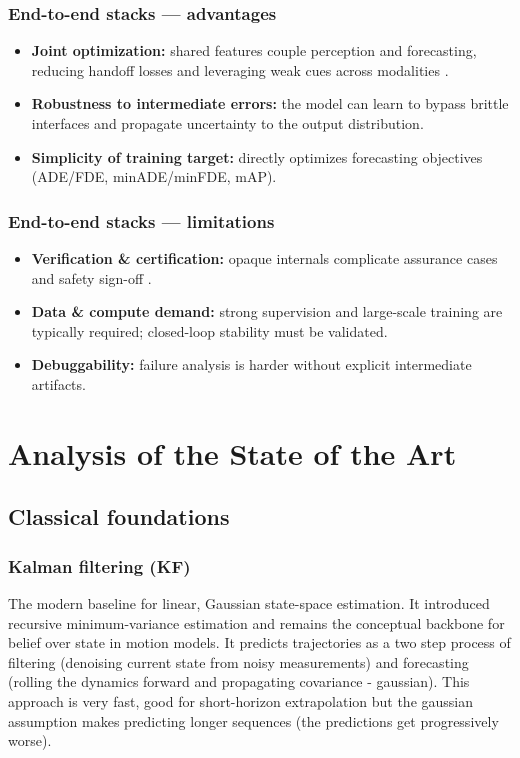 \documentclass[12pt,a4paper]{report}
\begin{document}
\subsubsection{End-to-end stacks — advantages}
\begin{itemize}
  \item \textbf{Joint optimization:} shared features couple perception and forecasting, reducing handoff losses and leveraging weak cues across modalities \cite{BEVerse2022}.
  \item \textbf{Robustness to intermediate errors:} the model can learn to bypass brittle interfaces and propagate uncertainty to the output distribution.
  \item \textbf{Simplicity of training target:} directly optimizes forecasting objectives (ADE/FDE, minADE/minFDE, mAP).
\end{itemize}

\subsubsection{End-to-end stacks — limitations}
\begin{itemize}
  \item \textbf{Verification \& certification:} opaque internals complicate assurance cases and safety sign-off \cite{ISO21448}.
  \item \textbf{Data \& compute demand:} strong supervision and large-scale training are typically required; closed-loop stability must be validated.
  \item \textbf{Debuggability:} failure analysis is harder without explicit intermediate artifacts.
\end{itemize}

\section{Analysis of the State of the Art}
\subsection{Classical foundations}
\subsubsection{Kalman filtering (KF)}
\quad The modern baseline for linear, Gaussian state-space estimation. It introduced recursive minimum-variance estimation and remains the conceptual backbone for belief over state in motion models. It predicts trajectories as a two step process of filtering (denoising current state from noisy measurements) and forecasting (rolling the dynamics forward and propagating covariance - gaussian). This approach is very fast, good for short-horizon extrapolation but the gaussian assumption makes predicting longer sequences (the predictions get progressively worse). \cite{Kalman1960}
\end{document}

